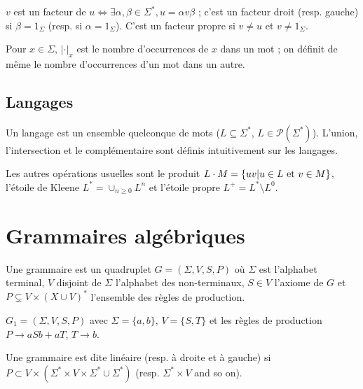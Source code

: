 \documentclass[a4paper]{article}
\begin{document}
\begin{defi}
$v$ est un facteur de $u \Leftrightarrow \exists \alpha, \beta \in \Sigma^*, u=\alpha v\beta$ ; c'est un facteur droit (resp. gauche) si $\beta=1_\Sigma$ (resp. si $\alpha=1_\Sigma$). C'est un facteur propre si $v\neq u$ et $v\neq 1_\Sigma$.
\end{defi}

\begin{defi}
Pour $x\in\Sigma$, $|\cdot|_x$ est le nombre d'occurrences de $x$ dans un mot ; on définit de même le nombre d'occurrences d'un mot dans un autre.
\end{defi}

\subsection{Langages}

Un langage est un ensemble quelconque de mots ($L\subseteq\Sigma^*$, $L\in\mathcal{P}(\Sigma^*)$). L'union, l'intersection et le complémentaire sont définis intuitivement sur les langages.

\begin{defi}
Les autres opérations usuelles sont le produit $L\cdot M = \{uv|u\in L\textnormal{ et }v\in M\}$, l'étoile de Kleene $L^*=\cup_{n\geqslant 0}L^n$ et l'étoile propre $L^+=L^*\setminus L^0$.
\end{defi}


\section{Grammaires algébriques}

\begin{defi}
Une grammaire est un quadruplet $G=(\Sigma,V,S,P)$ où $\Sigma$ est l'alphabet terminal, $V$ disjoint de $\Sigma$ l'alphabet des non-terminaux, $S\in V$ l'axiome de $G$ et $P\subsetneq V\times (X\cup V)^*$ l'ensemble des règles de production.
\end{defi}

\begin{ex}$G_1 = (\Sigma, V, S, P)$ avec $\Sigma=\{a,b\}$, $V=\{S,T\}$ et les règles de production $P\rightarrow aSb+aT$, $T\rightarrow b$.\end{ex}

\begin{defi}
Une grammaire est dite linéaire (resp. à droite et à gauche) si $P\subset V\times(\Sigma^*\times V\times\Sigma^*\cup\Sigma^*)$ (resp. $\Sigma^*\times V$ and so on).
\end{defi}
\end{document}
